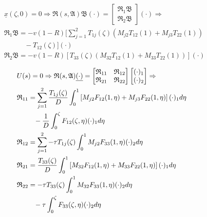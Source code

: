 \begin{equation} \label{eq:resolvent_u}
    \begin{aligned}
        &\underline{x}(\zeta,0) = 0 \Rightarrow \mathfrak{R}(s, \mathfrak{A}) \mathfrak{B} (\cdot) = \begin{bmatrix}
            \mathfrak{R}_{1} \mathfrak{B}\\
            \mathfrak{R}_{2} \mathfrak{B}
        \end{bmatrix} (\cdot) \Rightarrow\\
        &\mathfrak{R}_{1} \mathfrak{B} = -v(1-R) \bigl[ \sum_{j=1}^{2} T_{1j}(\zeta) (M_{j2} T_{12}(1) + M_{j3} T_{22}(1)) \\
        &\hspace{3em} - T_{12}(\zeta) \bigr] (\cdot)\\
        &\mathfrak{R}_{2} \mathfrak{B} = -v(1-R) \left[ T_{33}(\zeta) (M_{32} T_{12}(1) + M_{33} T_{22}(1)) \right] (\cdot)
    \end{aligned}
\end{equation}

\begin{equation} \label{eq:resolvent_x}
    \begin{aligned}
        &U(s) = 0 \Rightarrow \mathfrak{R}(s, \mathfrak{A}) \underline{(\cdot)} = \begin{bmatrix}
            \mathfrak{R}_{11} & \mathfrak{R}_{12}\\
            \mathfrak{R}_{21} & \mathfrak{R}_{22}
        \end{bmatrix} \begin{bmatrix}
            (\cdot)_1\\ (\cdot)_2
        \end{bmatrix} \Rightarrow\\
        &\mathfrak{R}_{11} = \sum_{j=1}^2 \frac{T_{1j}(\zeta)}{D} \int_0^1 \left[ M_{j2} F_{12}(1,\eta) + M_{j3} F_{22}(1,\eta) \right] (\cdot)_1 d\eta\\
        &\hspace{2.5em} -\frac{1}{D} \int_0^{\zeta} F_{12}(\zeta, \eta) (\cdot)_1 d\eta\\
        &\mathfrak{R}_{12} = \sum_{j=1}^2 -\tau T_{1j}(\zeta) \int_0^1 M_{j2} F_{33}(1,\eta) (\cdot)_2 d\eta\\
        &\mathfrak{R}_{21} = \frac{T_{33}(\zeta)}{D} \int_0^1 \left[ M_{32} F_{12}(1,\eta) + M_{33} F_{22}(1,\eta) \right] (\cdot)_1 d\eta\\
        &\mathfrak{R}_{22} = -\tau T_{33}(\zeta) \int_0^1 M_{32} F_{33}(1,\eta) (\cdot)_2 d\eta\\
        &\hspace{2.5em} -\tau \int_0^{\zeta} F_{33}(\zeta, \eta) (\cdot)_2 d\eta \\
    \end{aligned}
\end{equation}

